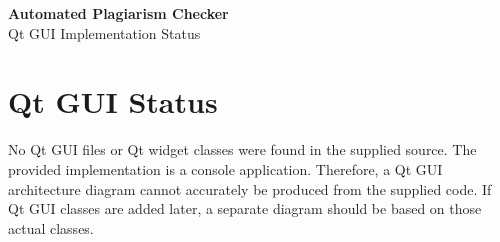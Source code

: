 \documentclass[11pt]{article}
\begin{document}
\begin{center}
{\LARGE\bfseries Automated Plagiarism Checker}\\[2mm]
{\large Qt GUI Implementation Status}
\end{center}
\vspace{4mm}

\section*{Qt GUI Status}
No Qt GUI files or Qt widget classes were found in the supplied source. The provided implementation is a console application. Therefore, a Qt GUI architecture diagram cannot accurately be produced from the supplied code. If Qt GUI classes are added later, a separate diagram should be based on those actual classes.
\end{document}
